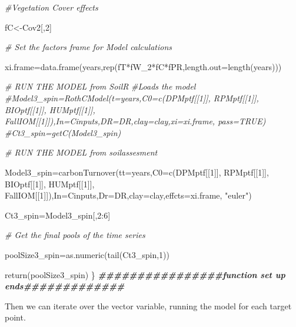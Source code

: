 \documentclass[
  10pt,
  b5paper,
]{book}
\newenvironment{Shaded}{\begin{snugshade}}{\end{snugshade}}
\newcommand{\AttributeTok}[1]{\textcolor[rgb]{0.77,0.63,0.00}{#1}}
\newcommand{\CommentTok}[1]{\textcolor[rgb]{0.56,0.35,0.01}{\textit{#1}}}
\newcommand{\DecValTok}[1]{\textcolor[rgb]{0.00,0.00,0.81}{#1}}
\newcommand{\DocumentationTok}[1]{\textcolor[rgb]{0.56,0.35,0.01}{\textbf{\textit{#1}}}}
\newcommand{\FunctionTok}[1]{\textcolor[rgb]{0.00,0.00,0.00}{#1}}
\newcommand{\NormalTok}[1]{#1}
\newcommand{\OtherTok}[1]{\textcolor[rgb]{0.56,0.35,0.01}{#1}}
\newcommand{\SpecialCharTok}[1]{\textcolor[rgb]{0.00,0.00,0.00}{#1}}
\newcommand{\StringTok}[1]{\textcolor[rgb]{0.31,0.60,0.02}{#1}}
\begin{document}
\begin{Shaded}
\begin{Highlighting}[]
\CommentTok{\#Vegetation Cover effects  }

\NormalTok{fC}\OtherTok{\textless{}{-}}\NormalTok{Cov2[,}\DecValTok{2}\NormalTok{]}

\CommentTok{\# Set the factors frame for Model calculations}

\NormalTok{xi.frame}\OtherTok{=}\FunctionTok{data.frame}\NormalTok{(years,}\FunctionTok{rep}\NormalTok{(fT}\SpecialCharTok{*}\NormalTok{fW\_2}\SpecialCharTok{*}\NormalTok{fC}\SpecialCharTok{*}\NormalTok{fPR,}\AttributeTok{length.out=}\FunctionTok{length}\NormalTok{(years)))}

\CommentTok{\# RUN THE MODEL from SoilR}
\CommentTok{\#Loads the model }
\CommentTok{\#Model3\_spin=RothCModel(t=years,C0=c(DPMptf[[1]], RPMptf[[1]], BIOptf[[1]], HUMptf[[1]], FallIOM[[1]]),In=Cinputs,DR=DR,clay=clay,xi=xi.frame, pass=TRUE) }
\CommentTok{\#Ct3\_spin=getC(Model3\_spin)}

\CommentTok{\# RUN THE MODEL from soilassesment}

\NormalTok{Model3\_spin}\OtherTok{=}\FunctionTok{carbonTurnover}\NormalTok{(}\AttributeTok{tt=}\NormalTok{years,}\AttributeTok{C0=}\FunctionTok{c}\NormalTok{(DPMptf[[}\DecValTok{1}\NormalTok{]], RPMptf[[}\DecValTok{1}\NormalTok{]], BIOptf[[}\DecValTok{1}\NormalTok{]], HUMptf[[}\DecValTok{1}\NormalTok{]], FallIOM[[}\DecValTok{1}\NormalTok{]]),}\AttributeTok{In=}\NormalTok{Cinputs,}\AttributeTok{Dr=}\NormalTok{DR,}\AttributeTok{clay=}\NormalTok{clay,}\AttributeTok{effcts=}\NormalTok{xi.frame, }\StringTok{"euler"}\NormalTok{) }

\NormalTok{Ct3\_spin}\OtherTok{=}\NormalTok{Model3\_spin[,}\DecValTok{2}\SpecialCharTok{:}\DecValTok{6}\NormalTok{]}

\CommentTok{\# Get the final pools of the time series}

\NormalTok{poolSize3\_spin}\OtherTok{=}\FunctionTok{as.numeric}\NormalTok{(}\FunctionTok{tail}\NormalTok{(Ct3\_spin,}\DecValTok{1}\NormalTok{))}

\FunctionTok{return}\NormalTok{(poolSize3\_spin)}
\NormalTok{\}}
\DocumentationTok{\#\#\#\#\#\#\#\#\#\#\#\#\#\#\#\#function set up ends\#\#\#\#\#\#\#\#\#\#\#\#\#}
\end{Highlighting}
\end{Shaded}

Then we can iterate over the vector variable, running the model for each target point.
\end{document}
